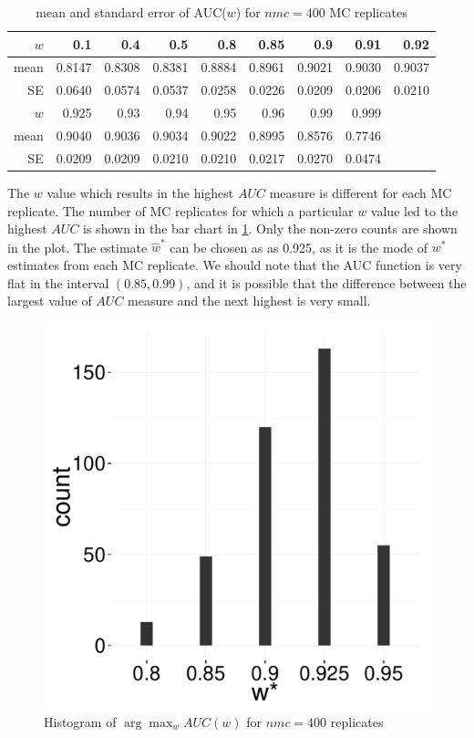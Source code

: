 \documentclass[12pt]{article} %
\begin{document}
\begin{table}[ht]
\centering
\begin{tabular}{rrrrrrrrr}
  \hline
 $w$ & 0.1 & 0.4 & 0.5 & 0.8 & 0.85 & 0.9 & 0.91 & 0.92 \\
  \hline
mean & 0.8147 & 0.8308 & 0.8381 & 0.8884 & 0.8961 & 0.9021 & 0.9030 & 0.9037  \\ 
  SE & 0.0640 & 0.0574 & 0.0537 & 0.0258 & 0.0226 & 0.0209 & 0.0206 & 0.0210   \\ 
	\hline
	  $w$ & 0.925& 0.93 & 0.94 & 0.95 & 0.96 & 0.99 & 0.999 & \\ 
		\hline
		mean & 0.9040 & 0.9036 & 0.9034 & 0.9022 & 0.8995 & 0.8576 & 0.7746 & \\
		SE & 0.0209 & 0.0209 & 0.0210 & 0.0210 & 0.0217 & 0.0270 & 0.0474 &\\
   \hline
\end{tabular}
\caption{mean and standard error of  AUC($w$) for $nmc=400$ MC replicates} 
\label{tab:AUCW}
\end{table}



  The $w$ value  which results in the highest $AUC$ measure  is different for each MC replicate.  The number of  MC replicates  for  which a particular $w$ value led to the highest $AUC$ is shown in  the bar chart in 	\ref{fig:ArgMaxWAUCW}. Only the non-zero counts are  shown in the plot. The estimate $\hat{w}^*$ can be chosen as  as 0.925, as it is the mode of $w^*$ estimates from each MC replicate. We should note that the AUC function is very flat in the interval $(0.85,0.99)$, and it is possible that the difference between the largest value of  $AUC$ measure and the next highest is very small.
\begin{figure}[h]
	\centering
	
		\includegraphics[scale=0.15]{auc_argmax_hist-paper.pdf}
	
	\caption{Histogram of $\arg\max_w AUC(w)$ for $nmc=400$ replicates}
	\label{fig:ArgMaxWAUCW}
\end{figure}
\end{document}
